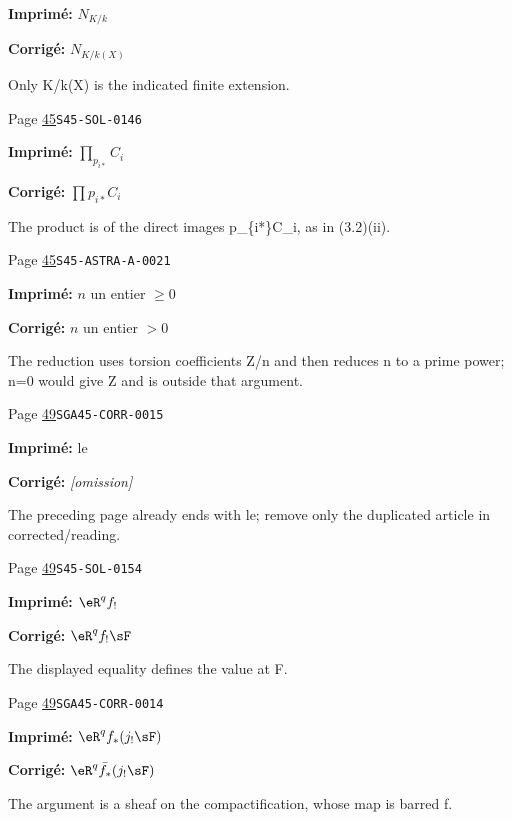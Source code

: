 \begin{description}
\par\noindent\textbf{Imprimé:} \(N_{K/k}\)
\par\noindent\textbf{Corrigé:} \(N_{K/k(X)}\)
\par\noindent Only K/k(X) is the indicated finite extension.
\smallskip
\item[\hypertarget{apparatus:FR-0018}{18}] Page \hyperlink{printpage:fr:45}{45}\quad\texttt{S45-SOL-0146}
\par\noindent\textbf{Imprimé:} \(\prod_{p_{i*}} C_i\)
\par\noindent\textbf{Corrigé:} \(\prod p_{i*} C_i\)
\par\noindent The product is of the direct images p\_\{i*\}C\_i, as in (3.2)(ii).
\smallskip
\item[\hypertarget{apparatus:FR-0019}{19}] Page \hyperlink{printpage:fr:45}{45}\quad\texttt{S45-ASTRA-A-0021}
\par\noindent\textbf{Imprimé:} $n$ un entier $\geqslant 0$
\par\noindent\textbf{Corrigé:} $n$ un entier $>0$
\par\noindent The reduction uses torsion coefficients Z/n and then reduces n to a prime power; n=0 would give Z and is outside that argument.
\smallskip
\item[\hypertarget{apparatus:FR-0020}{20}] Page \hyperlink{printpage:fr:49}{49}\quad\texttt{SGA45-CORR-0015}
\par\noindent\textbf{Imprimé:} le 
\par\noindent\textbf{Corrigé:} \emph{\textnormal{[omission]}}
\par\noindent The preceding page already ends with le; remove only the duplicated article in corrected/reading.
\smallskip
\item[\hypertarget{apparatus:FR-0021}{21}] Page \hyperlink{printpage:fr:49}{49}\quad\texttt{S45-SOL-0154}
\par\noindent\textbf{Imprimé:} \(\eR^q f_!\)
\par\noindent\textbf{Corrigé:} \(\eR^q f_! \sF\)
\par\noindent The displayed equality defines the value at F.
\smallskip
\item[\hypertarget{apparatus:FR-0022}{22}] Page \hyperlink{printpage:fr:49}{49}\quad\texttt{SGA45-CORR-0014}
\par\noindent\textbf{Imprimé:} \(\eR^q f_*(j_! \sF)\)
\par\noindent\textbf{Corrigé:} \(\eR^q \bar f_*(j_! \sF)\)
\par\noindent The argument is a sheaf on the compactification, whose map is barred f.

\end{description}
